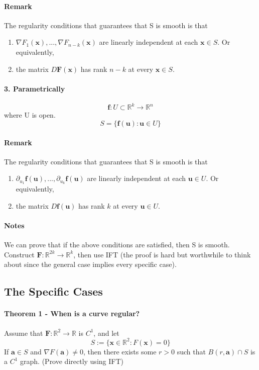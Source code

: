\documentclass[11pt]{article}
\newcommand{\tb}[1]{\textbf{#1}}
\newcommand{\real}[0]{\mathbb{R}}
\newcommand{\func}[3]{\tb{#1}: {#2} \rightarrow {#3} }
\begin{document}
\paragraph{Remark} The regularity conditions that guarantees that S is smooth is that
\begin{enumerate}
    \item $\nabla F_1(\tb{x}), ..., \nabla F_{n-k}(\tb{x})$ are linearly independent at each $\tb{x} \in S$. Or equivalently,
    \item the matrix $D\tb{F}(\tb{x})$ has rank $n-k$ at every $\tb{x} \in S$.
\end{enumerate}
\paragraph{3. Parametrically}
$$\func{f}{U \subset \real^k}{\real^{n}}$$ where U is open.
$$ S = \{\tb{f}(\tb{u}): \tb{u} \in U\}$$
\paragraph{Remark} The regularity conditions that guarantees that S is smooth is that
\begin{enumerate}
    \item $\partial_{u_1}\tb{f}(\tb{u}),...,\partial_{u_k}\tb{f}(\tb{u})$ are linearly independent at each $\tb{u} \in U$. Or equivalently,
    \item the matrix $D\tb{f}(\tb{u})$ has rank $k$ at every $\tb{u} \in U$.
\end{enumerate}
\paragraph{Notes} We can prove that if the above conditions are satisfied, then S is smooth. Construct $\func{F}{\real^{2k}}{\real^k}$, then use IFT (the proof is hard but worthwhile to think about since the general case implies every specific case).

\subsection{The Specific Cases}
\paragraph{Theorem 1 - When is a curve regular?}
Assume that $\func{F}{\real^2}{\real}$ is $C^1$, and let
$$S:=\{\tb{x} \in \real^2: F(\tb{x}) = 0 \}$$
If $\tb{a} \in S$ and $\nabla F(\tb{a}) \neq 0$, then there exists some $r>0$ such that $B(r, \tb{a}) \cap S$ is a $C^1$ graph. \newline
(Prove directly using IFT)
\end{document}
